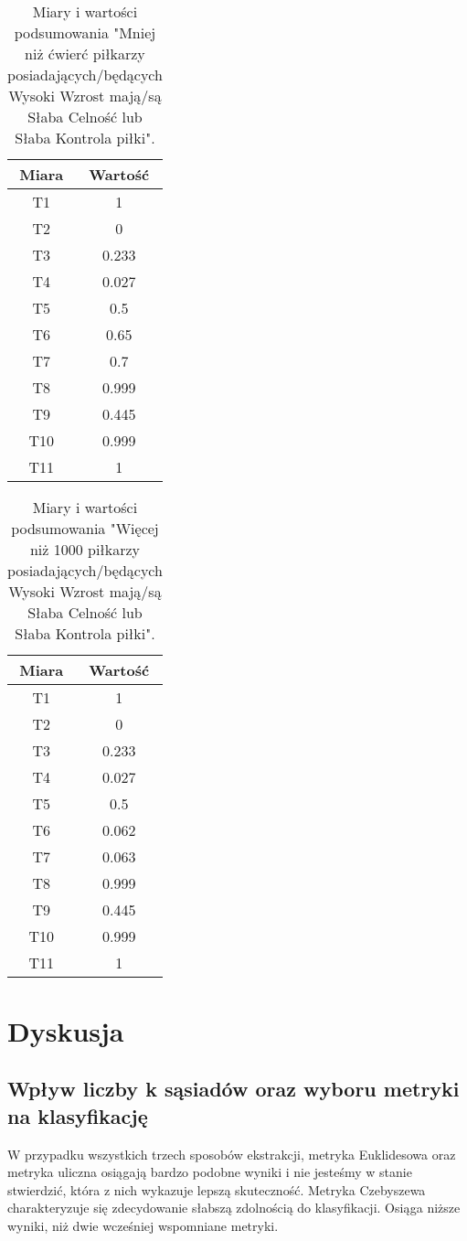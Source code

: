 \documentclass{classrep}
\begin{document}
^^^^^^
\begin{table}[H]
	\centering
	\begin{tabular}{c c } 
		\hline
		\textbf{Miara} & \textbf{Wartość}\\ [0.5ex] 
		\hline
		\hline 
		T1 & 1  \\
		T2 & 0 \\
		T3 & 0.233  \\
		T4 & 0.027 \\
		T5 & 0.5  \\
		T6 & 0.65 \\
		T7 & 0.7  \\
		T8 & 0.999 \\
		T9 & 0.445  \\
		T10 & 0.999 \\
		T11 & 1 \\
		\hline
	\end{tabular}
	\caption{Miary i wartości podsumowania "Mniej niż ćwierć piłkarzy posiadających/będących Wysoki Wzrost mają/są Słaba Celność lub Słaba Kontrola piłki".}
\end{table}

\begin{table}[H]
	\centering
	\begin{tabular}{c c } 
		\hline
		\textbf{Miara} & \textbf{Wartość}\\ [0.5ex] 
		\hline
		\hline 
		T1 & 1  \\
		T2 & 0 \\
		T3 & 0.233  \\
		T4 & 0.027 \\
		T5 & 0.5  \\
		T6 & 0.062 \\
		T7 & 0.063  \\
		T8 & 0.999 \\
		T9 & 0.445  \\
		T10 & 0.999 \\
		T11 & 1 \\
		\hline
	\end{tabular}
	\caption{Miary i wartości podsumowania "Więcej niż 1000 piłkarzy posiadających/będących Wysoki Wzrost mają/są Słaba Celność lub Słaba Kontrola piłki".}
\end{table}

\section{Dyskusja}

\subsection{Wpływ liczby k sąsiadów oraz wyboru metryki na klasyfikację}
W przypadku wszystkich trzech sposobów ekstrakcji, metryka Euklidesowa oraz metryka uliczna osiągają bardzo podobne wyniki i nie jesteśmy w stanie stwierdzić, która z nich wykazuje lepszą skuteczność. Metryka Czebyszewa charakteryzuje się zdecydowanie słabszą zdolnością do klasyfikacji. Osiąga niższe wyniki, niż dwie wcześniej wspomniane metryki.
 \newline
\end{document}
